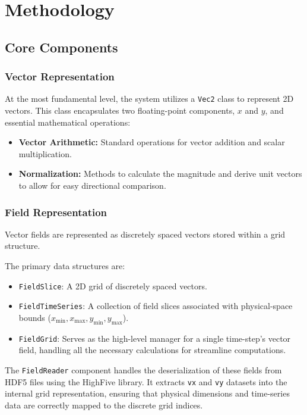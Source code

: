 \section{Methodology}

\subsection{Core Components}

\subsubsection{Vector Representation}
At the most fundamental level, the system utilizes a \texttt{Vec2} class to represent 2D vectors.
This class encapsulates two floating-point components, $x$ and $y$, and essential mathematical operations:
\begin{itemize}
	\item \textbf{Vector Arithmetic:} Standard operations for vector addition and scalar multiplication.
	\item \textbf{Normalization:} Methods to calculate the magnitude and derive unit vectors to allow for easy directional comparison.
\end{itemize}

\subsubsection{Field Representation}
Vector fields are represented as discretely spaced vectors stored within a grid structure.

The primary data structures are:
\begin{itemize}
	\item \texttt{FieldSlice}: A 2D grid of discretely spaced vectors.
	\item \texttt{FieldTimeSeries}: A collection of field slices associated with physical-space bounds ($x_{\text{min}}, x_{\text{max}}, y_{\text{min}}, y_{\text{max}}$).
	\item \texttt{FieldGrid}: Serves as the high-level manager for a single time-step's vector field, handling all the necessary calculations for streamline computations.
\end{itemize}

The \texttt{FieldReader} component handles the deserialization of these fields from HDF5 files using the HighFive library.
It extracts \texttt{vx} and \texttt{vy} datasets into the internal grid representation, ensuring that physical dimensions and time-series data are correctly mapped to the discrete grid indices.

